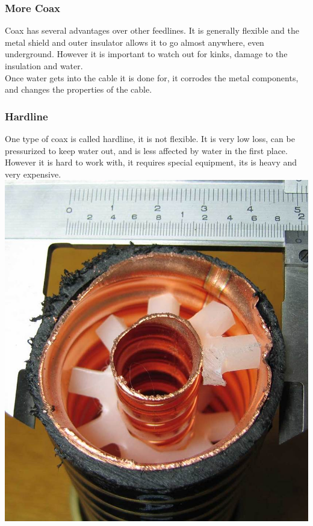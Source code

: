 \documentclass[10pt]{beamer}
\begin{document}
\begin{frame}
\frametitle{More Coax}
Coax has several advantages over other feedlines. It is generally flexible and the metal shield and outer insulator allows it to go almost anywhere, even underground. However it is important to watch out for kinks, damage to the insulation and water.\\
Once water gets into the cable it is done for, it corrodes the metal components, and changes the properties of the cable.
\end{frame}

\begin{frame}
\frametitle{Hardline}
One type of coax is called hardline, it is not flexible. It is very low loss, can be pressurized to keep water out, and is less affected by water in the first place.\\
However it is hard to work with, it requires special equipment, its is heavy and very expensive.\\
\includegraphics[height=.4\textheight]{4inhardline.jpg}
\end{frame}
\end{document}
